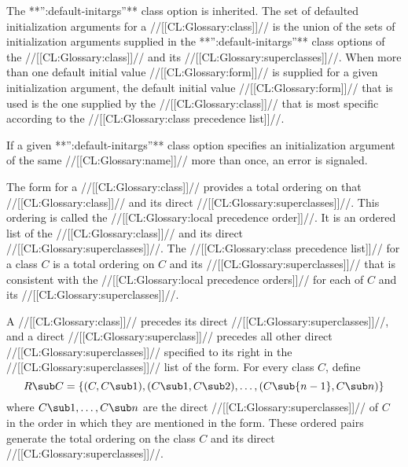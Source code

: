 \endsubsubsection%

     
The **'':default-initargs''** class option is inherited.  The set of
defaulted initialization arguments for a //[[CL:Glossary:class]]// is the union of the
sets of initialization arguments supplied in
the **'':default-initargs''** class options of the //[[CL:Glossary:class]]// and its //[[CL:Glossary:superclasses]]//.
When more than one default initial value //[[CL:Glossary:form]]// is supplied for a given
initialization argument, the default initial value //[[CL:Glossary:form]]// that is used
is the one supplied by the //[[CL:Glossary:class]]// that is most specific according to
the //[[CL:Glossary:class precedence list]]//.


If a given **'':default-initargs''** class option specifies an
initialization argument of the same //[[CL:Glossary:name]]// more than once, an
error  is signaled.

\endsubsubsection%


\endsubSection%



The  form for a //[[CL:Glossary:class]]// provides a total ordering
on that //[[CL:Glossary:class]]// and its direct //[[CL:Glossary:superclasses]]//.  This ordering is
called the //[[CL:Glossary:local precedence order]]//.  It is an ordered list of the
//[[CL:Glossary:class]]// and its direct //[[CL:Glossary:superclasses]]//. The
//[[CL:Glossary:class precedence list]]// for a class $C$ is a total ordering on
$C$ and its //[[CL:Glossary:superclasses]]// that is consistent with the
//[[CL:Glossary:local precedence orders]]// for each of $C$ and its //[[CL:Glossary:superclasses]]//.

A //[[CL:Glossary:class]]// precedes its direct //[[CL:Glossary:superclasses]]//, 
and a direct //[[CL:Glossary:superclass]]// precedes all other 
direct //[[CL:Glossary:superclasses]]// specified to its right 
in the //[[CL:Glossary:superclasses]]// list of the  form.  
For every class $C$, define $$R\sub C=\{(C,C\sub 1),(C\sub 1,C\sub
2),\ldots,(C\sub {n-1},C\sub n)\}$$ where $C\sub 1,\ldots,C\sub n$ are
the direct //[[CL:Glossary:superclasses]]// of $C$ in the order in which
they are mentioned in the  form. These ordered pairs
generate the total ordering on the class $C$ and its direct
//[[CL:Glossary:superclasses]]//.

